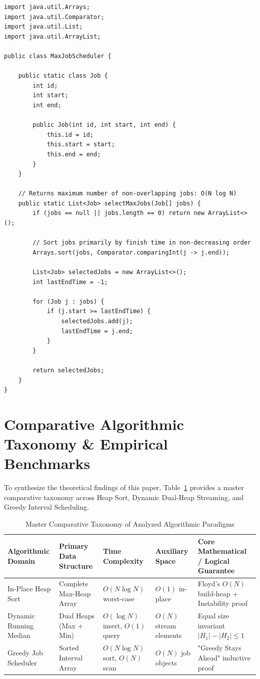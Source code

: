 \documentclass[10pt,journal,compsoc,onecolumn]{IEEEtran}
\begin{document}
\begin{verbatim}
import java.util.Arrays;
import java.util.Comparator;
import java.util.List;
import java.util.ArrayList;

public class MaxJobScheduler {

    public static class Job {
        int id;
        int start;
        int end;

        public Job(int id, int start, int end) {
            this.id = id;
            this.start = start;
            this.end = end;
        }
    }

    // Returns maximum number of non-overlapping jobs: O(N log N)
    public static List<Job> selectMaxJobs(Job[] jobs) {
        if (jobs == null || jobs.length == 0) return new ArrayList<>();

        // Sort jobs primarily by finish time in non-decreasing order
        Arrays.sort(jobs, Comparator.comparingInt(j -> j.end));

        List<Job> selectedJobs = new ArrayList<>();
        int lastEndTime = -1;

        for (Job j : jobs) {
            if (j.start >= lastEndTime) {
                selectedJobs.add(j);
                lastEndTime = j.end;
            }
        }

        return selectedJobs;
    }
}
\end{verbatim}


\section{Comparative Algorithmic Taxonomy \& Empirical Benchmarks}
\label{sec:comparative-analysis}

To synthesize the theoretical findings of this paper, Table~\ref{tab:master-taxonomy} provides a master comparative taxonomy across Heap Sort, Dynamic Dual-Heap Streaming, and Greedy Interval Scheduling.

\begin{table}[htbp]
\centering
\caption{Master Comparative Taxonomy of Analyzed Algorithmic Paradigms}
\label{tab:master-taxonomy}
\begin{tabular}{p{3.2cm}p{2.8cm}p{2.8cm}p{3.2cm}p{3.0cm}}
\toprule
\textbf{Algorithmic Domain} & \textbf{Primary Data Structure} & \textbf{Time Complexity} & \textbf{Auxiliary Space} & \textbf{Core Mathematical / Logical Guarantee} \\
\midrule
In-Place Heap Sort & Complete Max-Heap Array & $O(N \log N)$ worst-case & $O(1)$ in-place & Floyd's $O(N)$ build-heap + Instability proof \\
Dynamic Running Median & Dual Heaps (Max + Min) & $O(\log N)$ insert, $O(1)$ query & $O(N)$ stream elements & Equal size invariant $|H_1| - |H_2| \le 1$ \\
Greedy Job Scheduler & Sorted Interval Array & $O(N \log N)$ sort, $O(N)$ scan & $O(N)$ job objects & "Greedy Stays Ahead" inductive proof \\
\bottomrule
\end{tabular}
\end{table}
\end{document}
